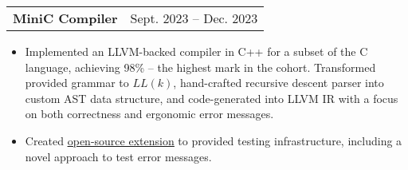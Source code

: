 \documentclass[letterpaper,11pt]{article}
\makeatletter
\newcommand{\resumeItem}[1]{
  \item\small{
    {#1 \vspace{-2pt}}
  }
}
\newcommand{\resumeProjectHeading}[2]{
    \item
    \begin{tabular*}{0.97\textwidth}{l@{\extracolsep{\fill}}r}
      \textbf{#1} & #2 \\
    \end{tabular*}\vspace{-7pt}
}
\newcommand{\resumeItemListStart}{\begin{itemize}[leftmargin=0.2in]}
\newcommand{\resumeItemListEnd}{\end{itemize}\vspace{-5pt}}
\makeatother
\begin{document}
    \resumeProjectHeading
      {MiniC Compiler}{Sept. 2023 -- Dec. 2023}
      \resumeItemListStart
        \resumeItem{Implemented an LLVM-backed compiler in C++ for a subset of the C language, achieving 98\% -- the highest mark in the cohort. Transformed provided grammar to $LL(k)$, hand-crafted recursive descent parser into custom AST data structure, and code-generated into LLVM IR with a focus on both correctness and ergonomic error messages.}
        \resumeItem{Created \href{https://github.com/EdmundGoodman/minic-medium-tests}{\underline{open-source extension}} to provided testing infrastructure, including a novel approach to test error messages.}
      \resumeItemListEnd



\end{document}
